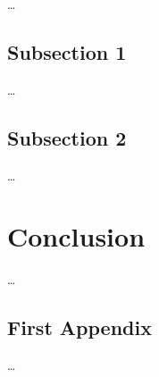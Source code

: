 \dots

\section{Subsection 1}
\label{ch:discussion:sec:subsection1}

\dots

\section{Subsection 2}
\label{ch:discussion:sec:subsection2}

\dots

\chapter{Conclusion}
\label{ch:conclusion}

\dots


{}

{}	%
{}	%

\pagebreak





\pagebreak
\appendix

{}	%
{}	%


\section{First Appendix}   %
\label{AppendixA}  
\setcounter{figure}{0}

\dots


\pagebreak


